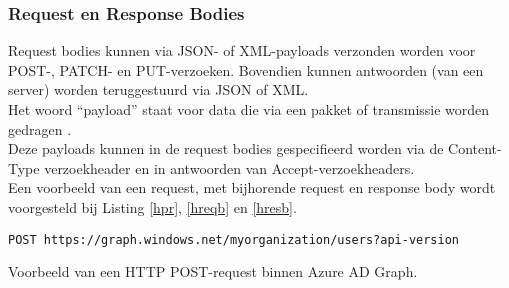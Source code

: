 \subsubsection{Request en Response Bodies}

Request bodies kunnen via \Ac{JSON}- of \ac{XML}-payloads verzonden worden voor POST-, PATCH- en PUT-verzoeken. Bovendien kunnen antwoorden (van een server) worden teruggestuurd via \ac{JSON} of \ac{XML}. \\

Het woord “payload” staat voor data die via een pakket of transmissie worden gedragen \autocite{Comer2006}. \\

Deze payloads kunnen in de request bodies gespecifieerd worden via de Content-Type verzoekheader en in antwoorden van Accept-verzoekheaders. \\

Een voorbeeld van een request, met bijhorende request en response body wordt voorgesteld bij Listing \ref{hpr}, \ref{hreqb} en \ref{hresb}. \\

\begin{listing}[h]
\begin{verbatim}
POST https://graph.windows.net/myorganization/users?api-version
\end{verbatim}
\caption[Voorbeeld HTTP POST-request]{Voorbeeld van een \ac{HTTP} POST-request binnen Azure \ac{AD} Graph.}
\label{hpr}
\end{listing}


